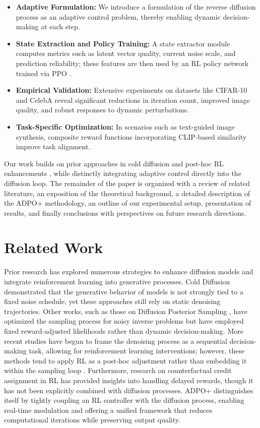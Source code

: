 \documentclass{article} %
\begin{document}
\begin{itemize}
  \item \textbf{Adaptive Formulation:} We introduce a formulation of the reverse diffusion process as an adaptive control problem, thereby enabling dynamic decision-making at each step.
  \item \textbf{State Extraction and Policy Training:} A state extractor module computes metrics such as latent vector quality, current noise scale, and prediction reliability; these features are then used by an RL policy network trained via PPO \citep{chatterji_2021_the}.
  \item \textbf{Empirical Validation:} Extensive experiments on datasets like CIFAR-10 and CelebA reveal significant reductions in iteration count, improved image quality, and robust responses to dynamic perturbations.
  \item \textbf{Task-Specific Optimization:} In scenarios such as text-guided image synthesis, composite reward functions incorporating CLIP-based similarity improve task alignment.
\end{itemize}

Our work builds on prior approaches in cold diffusion \citep{bansal_2022_cold} and post-hoc RL enhancements \citep{black_2023_training}, while distinctly integrating adaptive control directly into the diffusion loop. The remainder of the paper is organized with a review of related literature, an exposition of the theoretical background, a detailed description of the ADPO+ methodology, an outline of our experimental setup, presentation of results, and finally conclusions with perspectives on future research directions.

\section{Related Work}
\label{sec:related}
Prior research has explored numerous strategies to enhance diffusion models and integrate reinforcement learning into generative processes. Cold Diffusion \citep{bansal_2022_cold} demonstrated that the generative behavior of models is not strongly tied to a fixed noise schedule, yet these approaches still rely on static denoising trajectories. Other works, such as those on Diffusion Posterior Sampling \citep{chung_2022_diffusion}, have optimized the sampling process for noisy inverse problems but have employed fixed reward-adjusted likelihoods rather than dynamic decision-making. More recent studies have begun to frame the denoising process as a sequential decision-making task, allowing for reinforcement learning interventions; however, these methods tend to apply RL as a post-hoc adjustment rather than embedding it within the sampling loop \citep{black_2023_training}. Furthermore, research on counterfactual credit assignment in RL \citep{mesnard_2020_counterfactual} has provided insights into handling delayed rewards, though it has not been explicitly combined with diffusion processes. ADPO+ distinguishes itself by tightly coupling an RL controller with the diffusion process, enabling real-time modulation and offering a unified framework that reduces computational iterations while preserving output quality.
\end{document}
